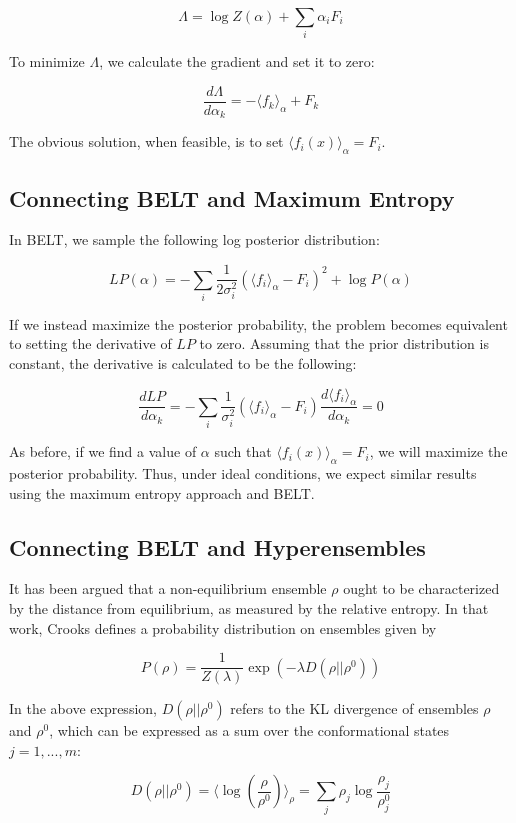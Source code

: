 \documentclass[12pt]{article}
\begin{document}
$$\Lambda = \log Z(\alpha) + \sum_i \alpha_i F_i$$

To minimize $\Lambda$, we calculate the gradient and set it to zero:

$$\frac{d\Lambda}{d\alpha_k} = -\langle f_k \rangle_\alpha + F_k$$

The obvious solution, when feasible, is to set $\langle f_i(x) \rangle_\alpha = F_i$.  


\subsection*{Connecting BELT and Maximum Entropy}


In BELT, we sample the following log posterior distribution:

$$LP(\alpha) = -\sum_i \frac{1}{2\sigma_i^2}(\langle f_i\rangle _\alpha - F_i)^2 + \log P(\alpha)$$

If we instead maximize the posterior probability, the problem becomes equivalent to setting the derivative of $LP$ to zero.  Assuming that the prior distribution is constant, the derivative is calculated to be the following:

$$ \frac{dLP}{d\alpha_k} =  -\sum_i \frac{1}{\sigma_i^2} (\langle f_i\rangle _\alpha - F_i) \frac{d\langle f_i\rangle _\alpha}{d\alpha_k} = 0$$

As before, if we find a value of $\alpha$ such that $\langle f_i(x) \rangle_\alpha = F_i$, we will maximize the posterior probability.  Thus, under ideal conditions, we expect similar results using the maximum entropy approach and BELT.  

\subsection*{Connecting BELT and Hyperensembles}

It has been argued \cite{crooks2007beyond} that a non-equilibrium ensemble $\rho$ ought to be characterized by the distance from equilibrium, as measured by the relative entropy.  In that work, Crooks defines a probability distribution on ensembles given by 

$$P(\rho) = \frac{1}{Z(\lambda)} \exp(- \lambda D(\rho || \rho^0))$$

In the above expression, $D(\rho || \rho^0)$ refers to the KL divergence of ensembles $\rho$ and $\rho^0$, which can be expressed as a sum over the conformational states $j = 1, ..., m$:

$$D(\rho || \rho^0) = \langle \log(\frac{\rho}{\rho^0})\rangle_\rho = \sum_j \rho_j \log \frac{\rho_j}{\rho^0_j}$$
\end{document}
